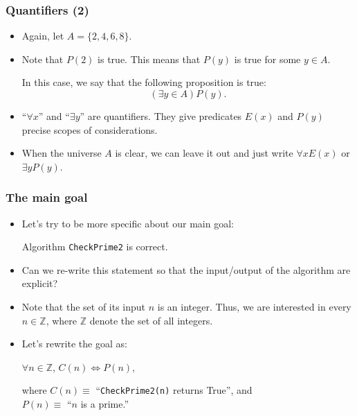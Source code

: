 \documentclass{beamer}
\begin{document}
\begin{frame}\frametitle{Quantifiers (2)}
  \begin{itemize}
  \item Again, let $A=\{2,4,6,8\}$.
  \item Note that $P(2)$ is true.  This means that $P(y)$ is true for
    some $y\in A$.  \pause

    In this case, we say that the following proposition is true:
    \[(\exists y\in A) P(y). \]

    \pause
  \item ``$\forall x$'' and ``$\exists y$'' are quantifiers.  They give
    predicates $E(x)$ and $P(y)$ precise scopes of considerations.
    
  \item When the universe $A$ is clear, we can leave it out and just
    write $\forall x E(x)$ or $\exists y P(y)$.
  \end{itemize}
\end{frame}

\begin{frame}\frametitle{The main goal}
  \begin{itemize}
  \item
    Let's try to be more specific about our main goal:
    
    \begin{tcolorbox}
      Algorithm {\tt CheckPrime2} is correct.
    \end{tcolorbox}

  \item
    Can we re-write this statement so that the input/output of the
    algorithm are explicit?

  \item
    Note that the set of its input $n$ is an integer.  Thus, we are
    interested in every $n\in\mathbb Z$, where $\mathbb Z$ denote the
    set of all integers.

  \item
    Let's rewrite the goal as:

    \begin{tcolorbox}
      \begin{center}
        $\forall n\in\mathbb Z$,
        $C(n)\Leftrightarrow P(n)$,
      \end{center}
    \end{tcolorbox}

    where $C(n)\equiv$ \pause ``{\tt CheckPrime2(n)} returns True'', and \\
    $P(n)\equiv$ \pause ``$n$ is a prime.''
  \end{itemize}
\end{frame}
\end{document}

